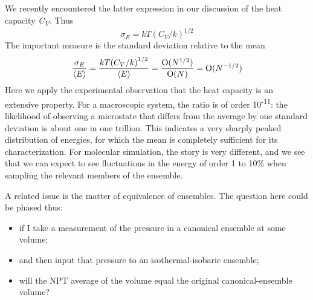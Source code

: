 \documentclass[]{article}
\begin{document}
We recently encountered the latter expression in our discussion of the
heat capacity \emph{C\textsubscript{V}}. Thus
\[{\sigma _E} = kT{({C_V}/k)^{1/2}}\]
The important measure is the standard deviation relative to the mean
\[\frac{{{\sigma _E}}}{{\left\langle E \right\rangle }} = \frac{{kT{{({C_V}/k)}^{1/2}}}}{{\left\langle E \right\rangle }} = \frac{{{\rm O}({N^{1/2}})}}{{{\rm O}(N)}} = {\rm O}({N^{ - 1/2}})\]
Here we apply the experimental observation that the heat capacity is an
extensive property. For a macroscopic system, the ratio is of order
10\textsuperscript{-11}: the likelihood of observing a microstate that
differs from the average by one standard deviation is about one in one
trillion. This indicates a very sharply peaked distribution of energies,
for which the mean is completely sufficient for its characterization.
For molecular simulation, the story is very different, and we see that
we can expect to see fluctuations in the energy of order 1 to 10\% when
sampling the relevant members of the ensemble. 

A related issue is the matter of equivalence of ensembles. The question
here could be phased thus:

\begin{itemize}
\item
  if I take a measurement of the pressure in a canonical ensemble at
  some volume;
\item
  and then input that pressure to an isothermal-isobaric ensemble;
\item
  will the NPT average of the volume equal the original
  canonical-ensemble volume?
\end{itemize}
\end{document}
